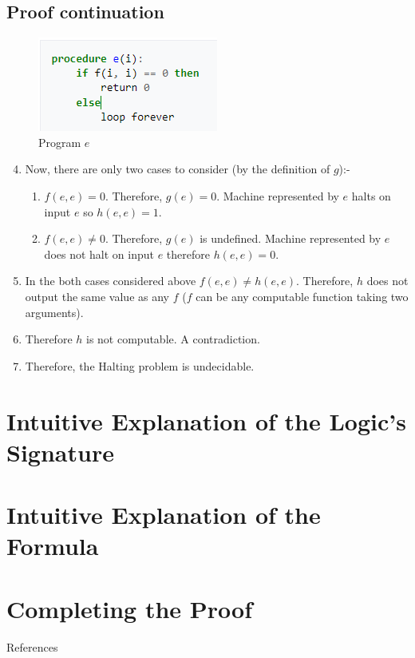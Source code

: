 \documentclass[
11pt,notheorems,hyperref={pdfauthor=whatever}
]{beamer}
\begin{document}
\subsection{Proof continuation}
\begin{frame}

\begin{figure}
    \centering
    \includegraphics{images/program.png}
    \caption{Program $e$}
    \label{fig:program_e}
\end{figure}

\begin{enumerate}
    \setcounter{enumi}{3}
    \item Now, there are only two cases to consider (by the definition of $g$):-
    \begin{enumerate}
        \item $f(e, e) = 0$. Therefore, $g(e) = 0$. Machine represented by $e$ halts on input $e$ so $h(e, e) = 1$.
        \item $f(e, e) \not= 0$. Therefore, $g(e)$ is undefined. Machine represented by $e$ does not halt on input $e$ therefore $h(e, e) = 0$.
    \end{enumerate}
    \item In the both cases considered above $f(e, e) \not= h(e, e)$. Therefore, $h$ does not output the same value as any $f$ ($f$ can be any computable function taking two arguments).
    \item Therefore $h$ is not computable. A contradiction.
    \item Therefore, the Halting problem is undecidable.
\end{enumerate}
\end{frame}


\section{Intuitive Explanation of the Logic's Signature}
\begin{frame}
\end{frame}

\section{Intuitive Explanation of the Formula}
\begin{frame}
\end{frame}

\section{Completing the Proof}
\begin{frame}
\end{frame}

\begin{frame}[allowframebreaks]{References}
    \printbibliography
\end{frame}
\end{document}
